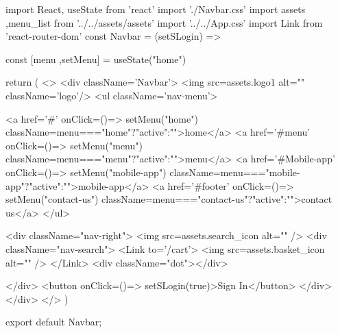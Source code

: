 import React, { useState } from 'react'
import './Navbar.css'
import {assets ,menu_list} from '../../assets/assets'
import '../../App.css'
import { Link } from 'react-router-dom'
const Navbar = ({setSLogin}) => {

      const [menu ,setMenu] = useState("home")

  return (
    <>
    <div className='Navbar'>
        <img src={assets.logo1} alt=""  className='logo'/>
      <ul className='nav-menu'>
        
        <a href='#' onClick={()=> setMenu("home")} className={menu==="home"?"active":""}>home</a>
        <a href='#menu' onClick={()=> setMenu("menu")} className={menu==="menu"?"active":""}>menu</a>
        <a href='#Mobile-app' onClick={()=> setMenu("mobile-app")} className={menu==="mobile-app"?"active":""}>mobile-app</a>
        <a href='#footer' onClick={()=> setMenu("contact-us")} className={menu==="contact-us"?"active":""}>contact us</a>
      </ul>
        




      <div className="nav-right">
          <img src={assets.search_icon} alt="" />
          <div className="nav-search">
        <Link to='/cart'>
            <img src={assets.basket_icon} alt=""  />
          </Link>
            <div className="dot"></div>

          </div>
          <button onClick={()=> setSLogin(true)}>Sign In</button>
      </div>
    </div>
    </>
  )
}

export default Navbar;
